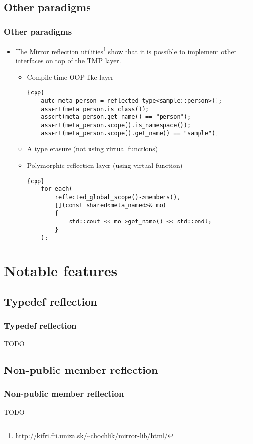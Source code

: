 \documentclass[compress,table,xcolor=table]{beamer}
\begin{document}
\subsection{Other paradigms}
\begin{frame}[fragile]
\frametitle{Other paradigms}
  \begin{itemize}
    \item The Mirror reflection utilities\footnote
      {\tiny{\url{http://kifri.fri.uniza.sk/~chochlik/mirror-lib/html/}}}
      show that it is possible to implement other interfaces on top of the TMP layer.
      \begin{itemize}
        \small
        \item Compile-time OOP-like layer
        \begin{lstlisting}{cpp}
	auto meta_person = reflected_type<sample::person>();
	assert(meta_person.is_class());
	assert(meta_person.get_name() == "person");
	assert(meta_person.scope().is_namespace());
	assert(meta_person.scope().get_name() == "sample");
        \end{lstlisting}
	\item A type erasure (not using virtual functions)
	\item Polymorphic reflection layer (using virtual function)
        \begin{lstlisting}{cpp}
	for_each(
	    reflected_global_scope()->members(),
	    [](const shared<meta_named>& mo)
	    {
	        std::cout << mo->get_name() << std::endl;
	    }
	);
        \end{lstlisting}
      \end{itemize}
  \end{itemize}
\end{frame}

\section{Notable features}

\subsection{Typedef reflection}
\begin{frame}
\frametitle{Typedef reflection}
\Huge TODO
\end{frame}

\subsection{Non-public member reflection}
\begin{frame}
\frametitle{Non-public member reflection}
\Huge TODO
\end{frame}
\end{document}
